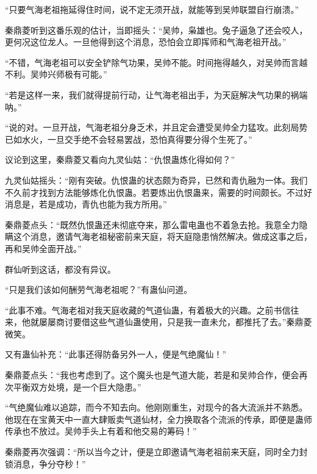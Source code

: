\begin{this_body}
“只要气海老祖拖延得住时间，说不定无须开战，就能等到吴帅联盟自行崩溃。”

秦鼎菱听到这番乐观的估计，当即摇头：“吴帅，枭雄也。兔子逼急了还会咬人，更何况这位龙人。一旦他得到这个消息，恐怕会立即挥师和气海老祖开战。”

“不错，气海老祖可以安全铲除气功果，吴帅不能。时间拖得越久，对吴帅而言越不利。吴帅兴师极有可能。”

“若是这样一来，我们就得提前行动，让气海老祖出手，为天庭解决气功果的祸端呐。”

“说的对。一旦开战，气海老祖分身乏术，并且定会遭受吴帅全力猛攻。此刻局势已如水火，一旦交手绝不会轻易罢战，恐怕真得要分得个生死了。”

议论到这里，秦鼎菱又看向九灵仙姑：“仇恨蛊炼化得如何？”

九灵仙姑摇头：“刚有突破。仇恨蛊的状态颇为奇异，已然和青仇融为一体。我们不久前才找到方法能够炼化仇恨蛊。若要炼出仇恨蛊来，需要的时间颇长。不过好消息是，若是成功，青仇也能为我方所用。”

秦鼎菱点头：“既然仇恨蛊还未彻底夺来，那么雷电蛊也不着急去抢。我意全力隐瞒这个消息，邀请气海老祖秘密前来天庭，将天庭隐患悄然解决。做成这事之后，再和吴帅全面开战。”

群仙听到这话，都没有异议。

“只是我们该如何酬劳气海老祖呢？”有蛊仙问道。

“此事不难。气海老祖对我天庭收藏的气道仙蛊，有着极大的兴趣。之前书信往来，他就屡屡商讨要借这些气道仙蛊使用，只是我一直未允，都推托了去。”秦鼎菱微笑。

又有蛊仙补充：“此事还得防备另外一人，便是气绝魔仙！”

秦鼎菱点头：“我也考虑到了。这个魔头也是气道大能，若是和吴帅合作，便会再次平衡双方处境，是一个巨大隐患。”

“气绝魔仙难以追踪，而今不知去向。他刚刚重生，对现今的各大流派并不熟悉。他现在在宝黄天中一直大肆贩卖气道仙材，全力换取各个流派的传承，即便是蛊师传承也不放过。吴帅手头上有着和他交易的筹码！”

秦鼎菱再次强调：“所以当今之计，便是立即邀请气海老祖前来天庭，同时全力封锁消息，争分夺秒！”

\end{this_body}

